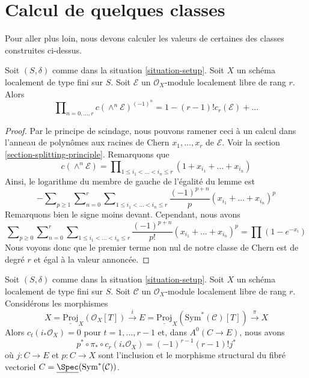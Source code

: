 \section{Calcul de quelques classes}
\label{section-calculate}

\noindent
Pour aller plus loin, nous devons calculer les valeurs de certaines des
classes construites ci-dessus.

\begin{lemma}
\label{lemma-compute-koszul}
Soit $(S, \delta)$ comme dans la situation \ref{situation-setup}. Soit $X$
un schéma localement de type fini sur $S$. Soit $\mathcal{E}$
un $\mathcal{O}_X$-module localement libre de rang $r$.
Alors
$$
\prod\nolimits_{n = 0, \ldots, r} c(\wedge^n \mathcal{E})^{(-1)^n} =
1 - (r - 1)! c_r(\mathcal{E}) + \ldots
$$
\end{lemma}

\begin{proof}
Par le principe de scindage, nous pouvons ramener ceci à un calcul dans
l'anneau de polynômes aux racines de Chern $x_1, \ldots, x_r$ de $\mathcal{E}$. Voir la
section \ref{section-splitting-principle}. Remarquons que
$$
c(\wedge^n \mathcal{E}) =
\prod\nolimits_{1 \leq i_1 < \ldots < i_n \leq r}
(1 + x_{i_1} + \ldots + x_{i_n})
$$
Ainsi, le logarithme du membre de gauche de l'égalité du lemme est
$$
-
\sum\nolimits_{p \geq 1}
\sum\nolimits_{n = 0}^r
\sum\nolimits_{1 \leq i_1 < \ldots < i_n \leq r}
\frac{(-1)^{p + n}}{p}(x_{i_1} + \ldots + x_{i_n})^p
$$
Remarquons bien le signe moins devant. Cependant, nous avons
$$
\sum\nolimits_{p \geq 0}
\sum\nolimits_{n = 0}^r
\sum\nolimits_{1 \leq i_1 < \ldots < i_n \leq r}
\frac{(-1)^{p + n}}{p!}(x_{i_1} + \ldots + x_{i_n})^p
=
\prod (1 - e^{-x_i})
$$
Nous voyons donc que le premier terme non nul de notre classe de Chern
est de degré $r$ et égal à la valeur annoncée.
\end{proof}

\begin{lemma}
\label{lemma-compute-section}
Soit $(S, \delta)$ comme dans la situation \ref{situation-setup}. Soit $X$
un schéma localement de type fini sur $S$. Soit $\mathcal{C}$
un $\mathcal{O}_X$-module localement libre de rang $r$. Considérons les
morphismes
$$
X = \underline{\text{Proj}}_X(\mathcal{O}_X[T])
\xrightarrow{i}
E = \underline{\text{Proj}}_X(\text{Sym}^*(\mathcal{C})[T])
\xrightarrow{\pi}
X
$$
Alors $c_t(i_*\mathcal{O}_X) = 0$ pour $t = 1, \ldots, r - 1$ et, dans
$A^0(C \to E)$, nous avons
$$
p^* \circ \pi_* \circ c_r(i_*\mathcal{O}_X) = (-1)^{r - 1}(r - 1)! j^*
$$
où
$j : C \to E$ et $p : C \to X$ sont l'inclusion et le morphisme
structural du fibré vectoriel
$C = \underline{\Spec}(\text{Sym}^*(\mathcal{C}))$.
\end{lemma}


